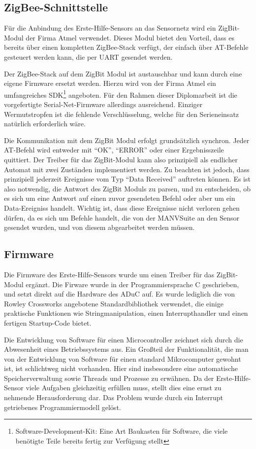 \subsection{ZigBee-Schnittstelle}
Für die Anbindung des Erste-Hilfe-Sensors an das Sensornetz wird ein ZigBit-Modul der Firma Atmel verwendet. 
Dieses Modul bietet den Vorteil, dass es bereits über einen kompletten ZigBee-Stack verfügt, der einfach über
AT-Befehle gesteuert werden kann, die per UART gesendet werden.

Der ZigBee-Stack auf dem ZigBit Modul ist austauschbar und kann durch eine eigene Firmware ersetzt werden.
Hierzu wird von der Firma Atmel ein umfangreiches SDK\footnote{Software-Development-Kit: Eine Art Baukasten für
Software, die viele benötigte Teile bereits fertig zur Verfügung stellt} angeboten. Für den Rahmen dieser Diplomarbeit
ist die vorgefertigte Serial-Net-Firmware allerdings ausreichend. Einziger Wermutstropfen ist die fehlende
Verschlüsselung, welche für den Serieneinsatz natürlich erforderlich wäre.

Die Kommunikation mit dem ZigBit Modul erfolgt grundsätzlich synchron. Jeder AT-Befehl wird entweder mit 
"`OK"', "`ERROR"' oder einer Ergebnisszeile quittiert. Der Treiber für das ZigBit-Modul kann also prinzipiell
als endlicher Automat mit zwei Zuständen implementiert werden. Zu beachten ist jedoch, dass prinzipiell
jederzeit Ereignisse vom Typ "`Data Received"' auftreten können. Es ist also notwendig, die Antwort des 
ZigBit Moduls zu parsen, und zu entscheiden, ob es sich um eine Antwort auf einen zuvor gesendeten Befehl
oder aber um ein Data-Ereigniss handelt. Wichtig ist, dass diese Ereignisse nicht verloren gehen dürfen,
da es sich um Befehle handelt, die von der MANVSuite an den Sensor gesendet wurden, und von diesem 
abgearbeitet werden müssen. 


\subsection{Firmware}
Die Firmware des Erste-Hilfe-Sensors wurde um einen Treiber für das ZigBit-Modul ergänzt. Die Firware wurde in der
Programmiersprache C geschrieben, und setzt direkt auf die Hardware des ADuC auf. Es wurde lediglich die von 
Rowley Crossworks angebotene Standardbibliothek verwendet, die einige praktische Funktionen wie Stringmanipulation,
einen Interrupthandler und einen fertigen Startup-Code bietet.

Die Entwicklung von Software für einen Microcontroller zeichnet sich durch die Abwesenheit eines Betriebssystems 
aus. Ein Großteil der Funktionalität, die man von der Entwicklung von Software für einen standard Mikrocomputer 
gewohnt ist, ist schlichtweg nicht vorhanden. Hier sind insbesondere eine automatische Speicherverwaltung sowie
Threads und Prozesse zu erwähnen. Da der Erste-Hilfe-Sensor viele Aufgaben gleichzeitig erfüllen muss, stellt 
dies eine ernst zu nehmende Herausforderung dar. Das Problem wurde durch ein Interrupt getriebenes Programmiermodell
gelöst.

